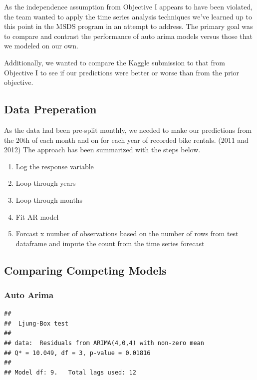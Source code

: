 \documentclass[american,]{article}
\begin{document}
As the independence assumption from Objective I appears to have been violated, the team wanted to apply the time series analysis techniques we've learned up to this point in the MSDS program in an attempt to address. The primary goal was to compare and contrast the performance of auto arima models versus those that we modeled on our own.

Additionally, we wanted to compare the Kaggle submission to that from Objective I to see if our predictions were better or worse than from the prior objective.

\hypertarget{data-preperation}{%
\subsection{Data Preperation}\label{data-preperation}}

As the data had been pre-split monthly, we needed to make our predictions from the 20th of each month and on for each year of recorded bike rentals. (2011 and 2012) The approach has been summarized with the steps below.

\begin{enumerate}
\def\labelenumi{\arabic{enumi}.}
\item
  Log the response variable
\item
  Loop through years
\item
  Loop through months
\item
  Fit AR model
\item
  Forcast x number of observations based on the number of rows from test dataframe and impute the count from the time series forecast
\end{enumerate}

\newpage

\hypertarget{comparing-competing-models-1}{%
\subsection{Comparing Competing Models}\label{comparing-competing-models-1}}

\hypertarget{auto-arima}{%
\subsubsection{Auto Arima}\label{auto-arima}}

\begin{verbatim}
## 
##  Ljung-Box test
## 
## data:  Residuals from ARIMA(4,0,4) with non-zero mean
## Q* = 10.049, df = 3, p-value = 0.01816
## 
## Model df: 9.   Total lags used: 12
\end{verbatim}
\end{document}
